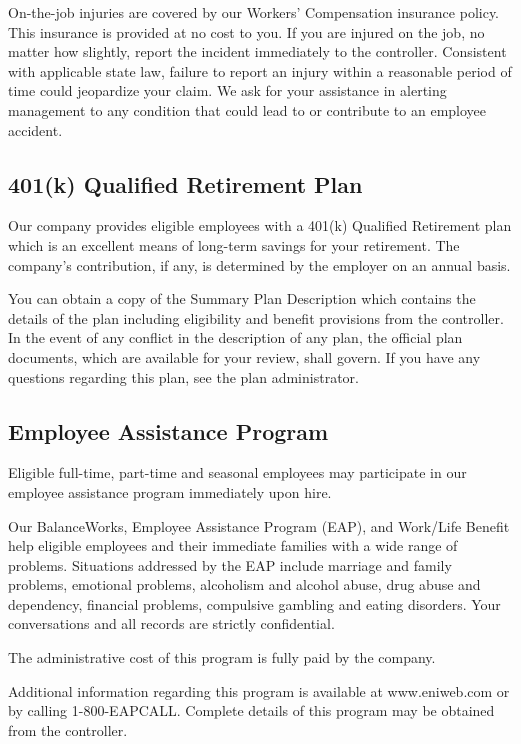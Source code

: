 \documentclass{book}
\begin{document}
On-the-job injuries are covered by our Workers’ Compensation insurance policy. This insurance is provided at no cost to you. If you are injured on the job, no matter how slightly, report the incident immediately to the controller. Consistent with applicable state law, failure to report an injury within a reasonable period of time could jeopardize your claim. We ask for your assistance in alerting management to any condition that could lead to or contribute to an employee accident.

\subsection{401(k) Qualified Retirement Plan}

Our company provides eligible employees with a 401(k) Qualified Retirement plan which is an excellent means of long-term savings for your retirement. The company's contribution, if any, is determined by the employer on an annual basis.

You can obtain a copy of the Summary Plan Description which contains the details of the plan including eligibility and benefit provisions from the controller. In the event of any conflict in the description of any plan, the official plan documents, which are available for your review, shall govern. If you have any questions regarding this plan, see the plan administrator.

\subsection{Employee Assistance Program}

Eligible full-time, part-time and seasonal employees may participate in our employee assistance program immediately upon hire.

Our BalanceWorks\textcopyright, Employee Assistance Program (EAP), and Work/Life Benefit help eligible employees and their immediate families with a wide range of problems. Situations addressed by the EAP include marriage and family problems, emotional problems, alcoholism and alcohol abuse, drug abuse and dependency, financial problems, compulsive gambling and eating disorders. Your conversations and all records are strictly confidential.

The administrative cost of this program is fully paid by the company.

Additional information regarding this program is available at www.eniweb.com or by calling 1-800-EAPCALL. Complete details of this program may be obtained from the controller.
\end{document}
